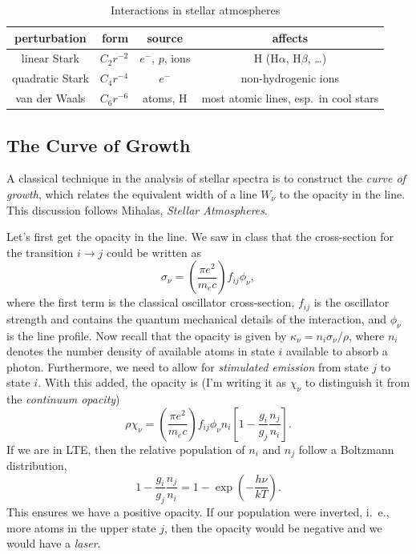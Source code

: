 \begin{table}[htbp]
\caption{Interactions in stellar atmospheres}\label{t.perturbers}
\begin{tabular}{crcc}
\hline
perturbation & form & source & affects\\
\hline\hline
linear Stark & $C_{2} r^{-2}$ & $e^{-}$, $p$, ions & H (H$\alpha$, H$\beta$, \ldots)\\
quadratic Stark & $C_{4} r^{-4}$ & $e^{-}$ & non-hydrogenic ions\\
van der Waals & $C_{6}r^{-6}$ & atoms, H & most atomic lines, esp.\ in cool stars\\
\hline
\end{tabular}
\end{table}


\subsection{The Curve of Growth}

A classical technique in the analysis of stellar spectra is to construct the \emph{curve of growth}, which relates the equivalent width of a line $W_{\nu}$ to the opacity in the line. This discussion follows Mihalas, \emph{Stellar Atmospheres}.

Let's first get the opacity in the line.  We saw in class that the cross-section for the transition $i\to j$ could be written as 
\begin{equation}\label{e.cross-section}
\sigma_{\nu} = \left(\frac{\pi e^{2}}{m_{e}c}\right)f_{ij}\phi_{\nu},
\end{equation}
where the first term is the classical oscillator cross-section, $f_{ij}$ is the oscillator strength and contains the quantum mechanical details of the interaction, and $\phi_{\nu}$ is the line profile.  Now recall that the opacity is given by $\kappa_{\nu} = n_{i}\sigma_{\nu}/\rho$, where $n_{i}$ denotes the number density of available atoms in state $i$ available to absorb a photon.  Furthermore, we need to allow for \emph{stimulated emission} from state $j$ to state $i$. With this added, the opacity is (I'm writing it as $\chi_{\nu}$ to distinguish it from the \emph{continuum opacity})
\begin{equation}\label{e.opacity}
\rho\chi_{\nu} = \left(\frac{\pi e^{2}}{m_{e}c}\right)f_{ij}\phi_{\nu}n_{i}\left[1 - \frac{g_{i}}{g_{j}}\frac{n_{j}}{n_{i}}\right].
\end{equation}
If we are in LTE, then the relative population of $n_{i}$ and $n_{j}$ follow a Boltzmann distribution,
\[ 1 - \frac{g_{i}}{g_{j}}\frac{n_{j}}{n_{i}} = 1- \exp\left(-\frac{h\nu}{kT}\right). \]
This ensures we have a positive opacity. If our population were inverted, i.~e., more atoms in the upper state $j$, then the opacity would be negative and we would have a \emph{laser}.


